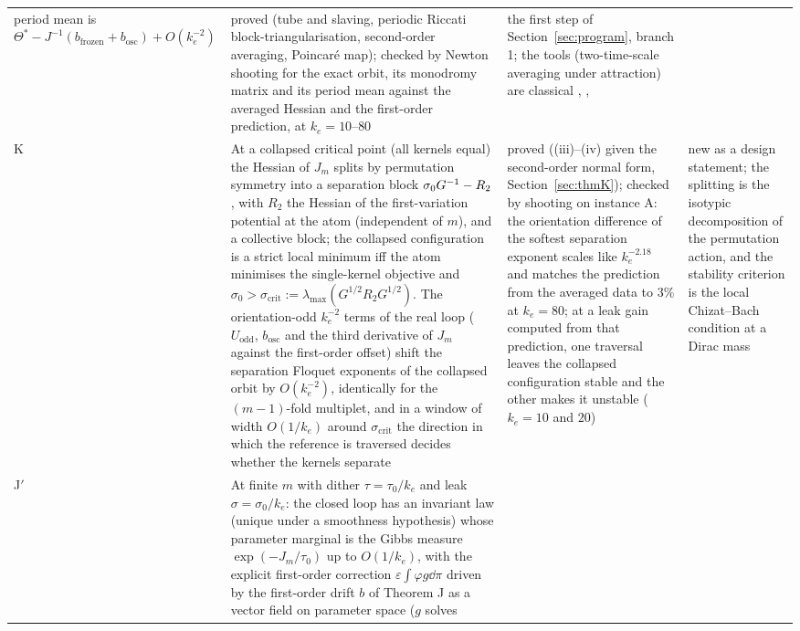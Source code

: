 {\begin{longtable}{@{}>{\raggedright\arraybackslash}p{}>{\raggedright\arraybackslash}p{}%
>{\raggedright\arraybackslash}p{}>{\raggedright\arraybackslash}p{}@{}}
period mean is $\Theta^* - J^{-1}(b_{\mathrm{frozen}} + b_{\mathrm{osc}}) + O(k_e^{-2})$
& proved (tube and slaving, periodic Riccati block-triangularisation, second-order averaging, Poincar\'e map);
checked by Newton shooting for the exact orbit, its monodromy matrix and its period mean against the averaged
Hessian and the first-order prediction, at $k_e = 10$--$80$
& the first step of Section~\ref{sec:program}, branch 1; the tools (two-time-scale averaging under attraction) are
classical \cite[Ch.~10--11]{khalil2002}, \cite[Ch.~5]{svm2007}, \cite[Ch.~4]{sb1989}\\
\addlinespace[0.5pt]
K & At a collapsed critical point (all kernels equal) the Hessian of $J_m$ splits by permutation symmetry into a
separation block $\sigma_0G^{-1} - R_2$, with $R_2$ the Hessian of the first-variation potential at the atom
(independent of $m$), and a collective block; the collapsed configuration is a strict local minimum iff the atom
minimises the single-kernel objective and $\sigma_0 > \sigma_{\mathrm{crit}} := \lambda_{\max}(G^{1/2}R_2G^{1/2})$.
The orientation-odd $k_e^{-2}$ terms of the real loop ($U_{\mathrm{odd}}$, $b_{\mathrm{osc}}$ and the third
derivative of $J_m$ against the first-order offset) shift the separation Floquet exponents of the collapsed orbit by
$O(k_e^{-2})$, identically for the $(m-1)$-fold multiplet, and in a window of width $O(1/k_e)$ around
$\sigma_{\mathrm{crit}}$ the direction in which the reference is traversed decides whether the kernels separate
& proved ((iii)--(iv) given the second-order normal form, Section~\ref{sec:thmK}); checked by shooting on
instance A: the orientation difference of the softest separation exponent scales like $k_e^{-2.18}$ and matches the
prediction from the averaged data to 3\% at $k_e = 80$; at a leak gain computed from that prediction, one traversal
leaves the collapsed configuration stable and the other makes it unstable ($k_e = 10$ and $20$)
& new as a design statement; the splitting is the isotypic decomposition of the permutation action, and the
stability criterion is the local Chizat--Bach condition at a Dirac mass\\
\addlinespace[0.5pt]
J$'$ & At finite $m$ with dither $\tau = \tau_0/k_e$ and leak $\sigma = \sigma_0/k_e$: the closed loop has an
invariant law (unique under a smoothness hypothesis) whose parameter marginal is the Gibbs measure
$\exp(-J_m/\tau_0)$ up to $O(1/k_e)$, with the explicit first-order correction $\varepsilon\int\varphi g\dd\pi$
driven by the first-order drift $b$ of Theorem J as a vector field on parameter space ($g$ solves

\end{longtable}}

